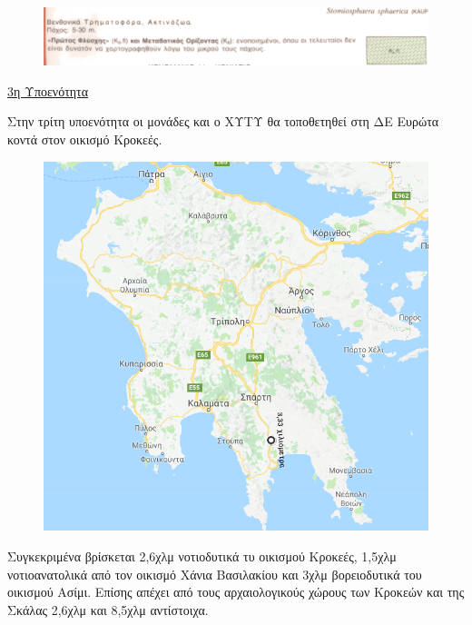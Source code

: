 \documentclass[12pt]{article}
\begin{document}
	 \begin{figure} [H]
	 	\begin{center}
	 		\includegraphics [scale = 0.40] {explain5.png}
	 	\end{center}
	 \end{figure}
 
 	\underline{3η Υποενότητα}
 	
 	Στην τρίτη υποενότητα οι μονάδες και ο ΧΥΤΥ θα τοποθετηθεί στη ΔΕ Ευρώτα κοντά στον οικισμό Κροκεές.
 	
 	\begin{figure} [H]
 		\begin{center}
 			\includegraphics [scale = 0.50] {map51.png}
 		\end{center}
 	\end{figure}
 
 	Συγκεκριμένα βρίσκεται 2,6χλμ νοτιοδυτικά τυ οικισμού Κροκεές, 1,5χλμ νοτιοανατολικά από τον οικισμό Χάνια Βασιλακίου και 3χλμ βορειοδυτικά του οικισμού Ασίμι. Επίσης απέχει από τους αρχαιολογικούς χώρους των Κροκεών και της Σκάλας 2,6χλμ και 8,5χλμ αντίστοιχα.
 	
\end{document}
